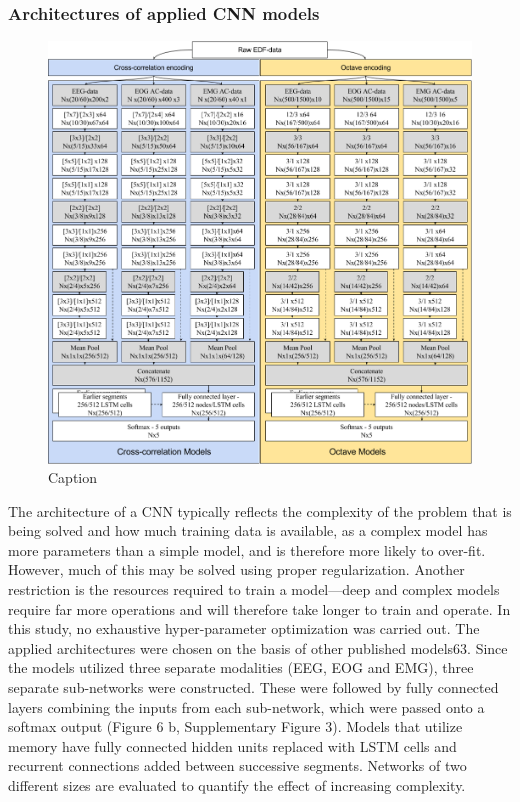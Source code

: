 \subsubsection{Architectures of applied CNN models}
\begin{figure}[tb]
    \centering
    \includegraphics[width=\textwidth]{figures/paper-iii/SuppFigure_3.png}
    \caption{Caption}
    \label{fig:paperiii-suppfigure03}
\end{figure}
The architecture of a CNN typically reflects the complexity of the problem that is being solved and how much training data is available, as a complex model has more parameters than a simple model, and is therefore more likely to over-fit. However, much of this may be solved using proper regularization. Another restriction is the resources required to train a model—deep and complex models require far more operations and will therefore take longer to train and operate. In this study, no exhaustive hyper-parameter optimization was carried out. The applied architectures were chosen on the basis of other published models63. Since the models utilized three separate modalities (EEG, EOG and EMG), three separate sub-networks were constructed. These were followed by fully connected layers combining the inputs from each sub-network, which were passed onto a softmax output (Figure 6 b, Supplementary Figure 3). Models that utilize memory have fully connected hidden units replaced with LSTM cells and recurrent connections added between successive segments. Networks of two different sizes are evaluated to quantify the effect of increasing complexity. 

